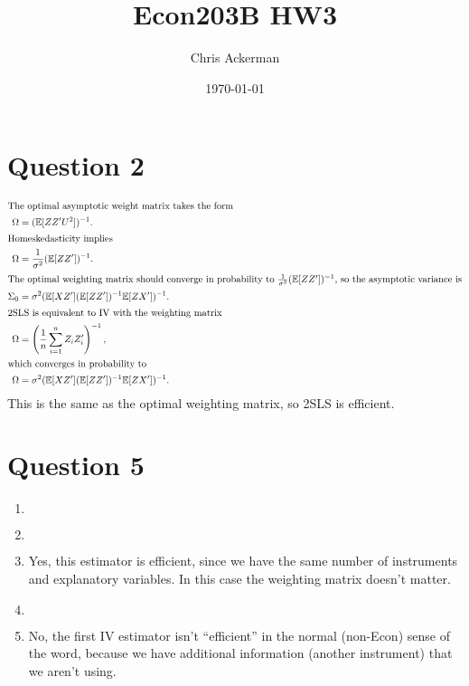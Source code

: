 \documentclass[11pt]{article}
\author{Chris Ackerman}
\date{\today}
\title{Econ203B HW3}
\newcommand{\E}{\mathbb{E}}
\begin{document}
\maketitle
\tableofcontents

\newpage

\section{Question 2}
\label{sec:orgbe58578}

  \begin{align*}
\intertext{The optimal asymptotic weight matrix takes the form}
\Omega &= (\E[ZZ'U^2])^{-1}.\\
\intertext{Homeskedasticity implies}
\Omega &= \frac{1}{\sigma^2}(\E[ZZ'])^{-1}.\\
\intertext{The optimal weighting matrix should converge in probability to $\frac{1}{\sigma^2} (\E [ZZ'])^{-1}$, so the asymptotic variance is}
\Sigma_0 &= \sigma^2 (\E [XZ'](\E[ZZ'])^{-1}\E[ZX'])^{-1}.\\
\intertext{2SLS is equivalent to IV with the weighting matrix}
\Omega &= \left(\frac{1}{n}\sum^n_{i = 1} Z_i Z_i '\right)^{-1},\\
\intertext{which converges in probability to}
\Omega &= \sigma^2 (\E[XZ'](\E[ZZ'])^{-1} \E[ZX'])^{-1}.
  \end{align*}
This is the same as the optimal weighting matrix, so 2SLS is efficient.

\newpage
\section{Question 5}
\label{sec:orgb1aecd7}
  \begin{enumerate}[label=\alph*)]
\item $ $\\ 
\item $ $\\ 
\item Yes, this estimator is efficient, since we have the same number of instruments and explanatory variables. In this case the weighting matrix doesn't matter.
\item $ $\\ 
\item No, the first IV estimator isn't ``efficient'' in the normal (non-Econ) sense of the word, because we have additional information (another instrument) that we aren't using.
  \end{enumerate}
\newpage
\inputminted[linenos]{python}{question5.py}
\end{document}
